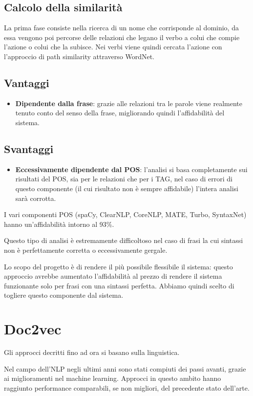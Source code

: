 \documentclass[twoside]{supsistudent}
\begin{document}
\subsection{Calcolo della similarità}
La prima fase consiste nella ricerca di un nome che corrisponde al dominio, da essa vengono poi percorse delle relazioni che legano il verbo a colui che compie l'azione o colui che la subisce. Nei verbi viene quindi cercata l'azione con l'approccio di path similarity attraverso WordNet.
\subsection{Vantaggi}
\begin{itemize}
  \item \textbf{Dipendente dalla frase}: grazie alle relazioni tra le parole viene realmente tenuto conto del senso della frase, migliorando quindi l'affidabilità del sistema.
\end{itemize}
\subsection{Svantaggi}
\begin{itemize}
  \item \textbf{Eccessivamente dipendente dal POS}: l'analisi si basa completamente sui risultati del POS, sia per le relazioni che per i TAG, nel caso di errori di questo componente (il cui risultato non è sempre affidabile) l'intera analisi sarà corrotta.
\end{itemize}
I vari componenti POS (spaCy, ClearNLP, CoreNLP, MATE, Turbo, SyntaxNet) hanno un'affidabilità intorno al 93\%\cite{POS_scores}.

Questo tipo di analisi è estremamente difficoltoso nel caso di frasi la cui sintassi non è perfettamente corretta o eccessivamente gergale.  

Lo scopo del progetto è di rendere il più possibile flessibile il sistema: questo approccio avrebbe aumentato l'affidabilità al prezzo di rendere il sistema funzionante solo per frasi con una sintassi perfetta. Abbiamo quindi scelto di togliere questo componente dal sistema.
\newpage
\section{Doc2vec}
Gli approcci decritti fino ad ora si basano sulla linguistica.

Nel campo dell'NLP negli ultimi anni sono stati compiuti dei passi avanti, grazie ai miglioramenti nel machine learning. Approcci in questo ambito hanno raggiunto performance comparabili, se non migliori, del precedente stato dell'arte. 
\end{document}
